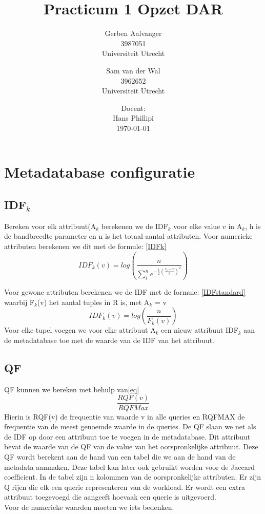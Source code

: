 \documentclass[a4paper]{article}
\begin{document}
\title{Practicum 1 Opzet DAR}
\author{Gerben Aalvanger\\ 
         3987051 \\
        Universiteit Utrecht
		\and
		Sam van der Wal\\ 
         3962652 \\
        Universiteit Utrecht
        }
\date{Docent: \\ 
Hans Phillipi \\
\today}
\maketitle

\section{Metadatabase configuratie}
\subsection{IDF$_k$}
Bereken voor elk attribuut(A$_k$ berekenen we de IDF$_k$ voor elke value $v$ in A$_k$, h is de bandbreedte parameter en n is het totaal aantal attributen. 
Voor numerieke attributen berekenen we dit met de formule: \eqref{IDFk}
\begin{equation}
IDF_k (v) = log(\frac{n}{\sum_{i}^{n}e^{-\frac{1}{2}(\frac{v_ i -v}{h})^2}})
\label{IDFk}
\end{equation}

Voor gewone attributen berekenen we de IDF met de formule: \eqref{IDFstandard} waarbij F$_k$(v) het aantal tuples in R is, met A$_k$ = v
\begin{equation}
IDF_k (v) = log(\frac{n}{F_k(v)})
\label{IDFstandard}
\end{equation}
Voor elke tupel voegen we voor elke attribuut A$_k$ een nieuw attribuut IDF$_k$ aan de metadatabase toe met de waarde van de IDF van het attribuut.
\subsection{QF}
QF kunnen we bereken met behulp van\eqref{eq}
\begin{equation}
\frac{RQF(v)}{RQFMax}
\label{eq}
\end{equation}
Hierin is RQF(v) de frequentie van waarde v in alle queries en RQFMAX de frequentie van de meest genoemde waarde in de queries.
De QF slaan we net als de IDF op door een attribuut toe te voegen in de metadatabase. Dit attribuut bevat de waarde van de QF van de value van het oorspronkelijke attribuut.
Deze QF wordt berekent aan de hand van een tabel die we aan de hand van de metadata aanmaken. Deze tabel kan later ook gebruikt worden voor de Jaccard coefficient. In de tabel zijn n kolommen van de oorspronkelijke attributen. Er zijn Q rijen die elk een querie representeren van de workload. Er wordt een extra attribuut toegevoegd die aangeeft hoevaak een querie is uitgevoerd.  \\
Voor de numerieke waarden moeten we iets bedenken.
\end{document}
